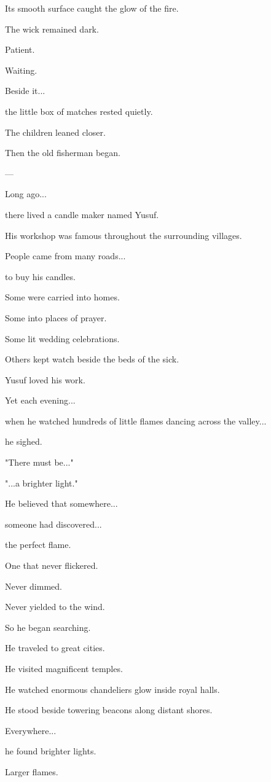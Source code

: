 \documentclass[12pt,openany]{book}
\begin{document}
Its smooth surface caught the glow of the fire.

The wick remained dark.

Patient.

Waiting.

Beside it...

the little box of matches rested quietly.

The children leaned closer.

Then the old fisherman began.

---

Long ago...

there lived a candle maker named Yusuf.

His workshop was famous throughout the surrounding villages.

People came from many roads...

to buy his candles.

Some were carried into homes.

Some into places of prayer.

Some lit wedding celebrations.

Others kept watch beside the beds of the sick.

Yusuf loved his work.

Yet each evening...

when he watched hundreds of little flames dancing across the valley...

he sighed.

"There must be..."

"...a brighter light."

He believed that somewhere...

someone had discovered...

the perfect flame.

One that never flickered.

Never dimmed.

Never yielded to the wind.

So he began searching.

He traveled to great cities.

He visited magnificent temples.

He watched enormous chandeliers glow inside royal halls.

He stood beside towering beacons along distant shores.

Everywhere...

he found brighter lights.

Larger flames.
\end{document}
